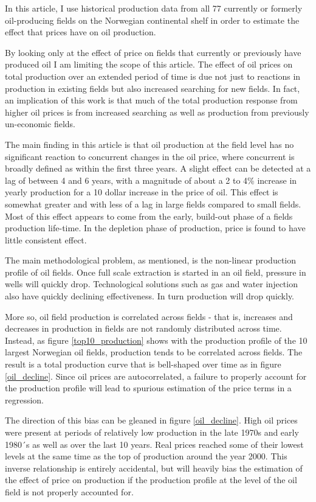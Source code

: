 \documentclass[12pt]{article}
\begin{document}
In this article, I use historical production data from all 77 currently or formerly oil-producing fields on the Norwegian continental shelf in order to estimate the effect that prices have on oil production.  

By looking only at the effect of price on fields that currently or previously have produced oil I am limiting the scope of this article.  The effect of oil prices on total production over an extended period of time is due not just to reactions in production in existing fields but also increased searching for new fields.  In fact, an implication of this work is that much of the total production response from higher oil prices is from increased searching as well as production from previously un-economic fields.

The main finding in this article is that oil production at the field level has no significant reaction to concurrent changes in the oil price, where concurrent is broadly defined as within the first three years.  A slight effect can be detected at a lag of between 4 and 6 years, with a magnitude of about a 2 to 4\% increase in yearly production for a 10 dollar increase in the price of oil.  This effect is somewhat greater and with less of a lag in large fields compared to small fields.  Most of this effect appears to come from the early, build-out phase of a fields production life-time.  In the depletion phase of production, price is found to have little consistent effect.  

The main methodological problem, as mentioned, is the non-linear production profile of oil fields.  Once full scale extraction is started in an oil field, pressure in wells will quickly drop.  Technological solutions such as gas and water injection also have quickly declining effectiveness.  In turn production will drop quickly. 

More so, oil field production is correlated across fields - that is, increases and decreases in production in fields are not randomly distributed across time.  Instead, as figure \ref{top10_production} shows with the production profile of the 10 largest Norwegian oil fields, production tends to be correlated across fields.  The result is a total production curve that is bell-shaped over time as in figure \ref{oil_decline}.  Since oil prices are autocorrelated, a failure to properly account for the production profile will lead to spurious estimation of the price terms in a regression.  

The direction of this bias can be gleaned in figure \ref{oil_decline}.  High oil prices were present at periods of relatively low production in the late 1970s and early 1980´s as well as over the last 10 years. Real prices reached some of their lowest levels at the same time as the top of production around the year 2000.  This inverse relationship is entirely accidental, but will heavily bias the estimation of the effect of price on production if the production profile at the level of the oil field is not properly accounted for.  
\end{document}
